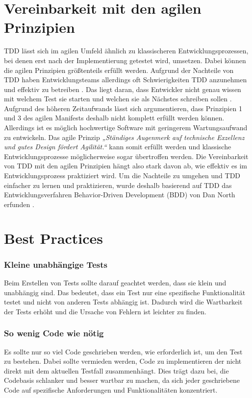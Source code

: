 \documentclass[a0,landscape]{a0poster}
\begin{document}
\begin{multicols}{4}
\section*{Vereinbarkeit mit den agilen Prinzipien}
TDD lässt sich im agilen Umfeld ähnlich zu klassischeren Entwicklungsprozessen, bei denen erst nach der Implementierung getestet wird, umsetzen. Dabei können die agilen Prinzipien größtenteils erfüllt werden.
\newline 
Aufgrund der Nachteile von TDD haben Entwicklungsteams allerdings oft Schwierigkeiten TDD anzunehmen und effektiv zu betreiben \cite{smart2023bdd}.  
Das liegt daran, dass Entwickler nicht genau wissen mit welchem Test sie starten und welchen sie als Nächstes schreiben sollen \cite{smart2023bdd}. 
\newline 
Aufgrund des höheren Zeitaufwands lässt sich argumentieren, dass Prinzipien 1 und 3 des agilen Manifests deshalb nicht komplett erfüllt werden können.
\newline 
Allerdings ist es möglich hochwertige Software mit geringerem Wartungsaufwand zu entwickeln. Das agile Prinzip \textit{„Ständiges Augenmerk auf technische Exzellenz und gutes Design fördert Agilität.“} kann somit erfüllt werden und klassische Entwicklungsprozesse möglicherweise sogar übertroffen werden.
\newline 
Die Vereinbarkeit von TDD mit den agilen Prinzipien hängt also stark davon ab, wie effektiv es im Entwicklungsprozess praktiziert wird.
\newline 
Um die Nachteile zu umgehen und TDD einfacher zu lernen und praktizieren, wurde deshalb basierend auf TDD das Entwicklungsverfahren Behavior-Driven Development (BDD) von Dan North erfunden \cite{smart2023bdd}.


\section*{Best Practices}

\subsubsection*{Kleine unabhängige Tests}
Beim Erstellen von Tests sollte darauf geachtet werden, dass sie klein und unabhängig sind. Das bedeutet, dass ein Test nur eine spezifische Funktionalität testet und nicht von anderen Tests abhängig ist. Dadurch wird die Wartbarkeit der Tests erhöht und die Ursache von Fehlern ist leichter zu finden.

\subsubsection*{So wenig Code wie nötig}
Es sollte nur so viel Code geschrieben werden, wie erforderlich ist, um den Test zu bestehen. Dabei sollte vermieden werden, Code zu implementieren der nicht direkt mit dem aktuellen Testfall zusammenhängt. Dies trägt dazu bei, die Codebasis schlanker und besser wartbar zu machen, da sich jeder geschriebene Code auf spezifische Anforderungen und Funktionalitäten konzentriert.


\end{multicols}
\end{document}
